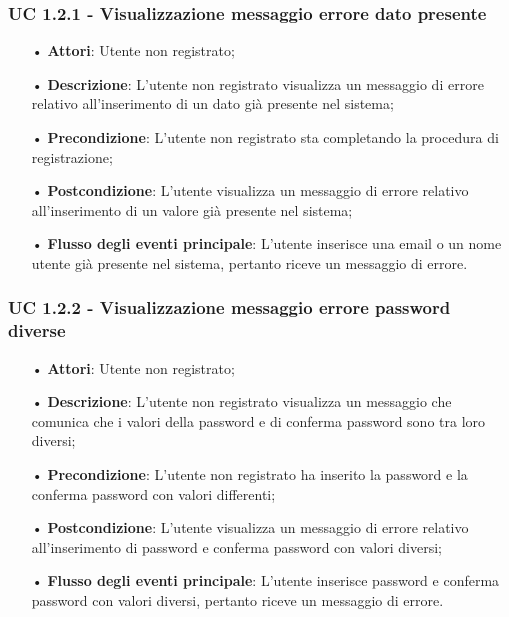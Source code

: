\subsubsection{UC 1.2.1 - Visualizzazione messaggio errore dato presente}
\begin{itemize}
	\item[•]\textbf{Attori}: Utente non registrato;
	\item[•]\textbf{Descrizione}: L'utente non registrato visualizza un messaggio di errore relativo all'inserimento
di un dato già presente nel sistema;
	\item[•]\textbf{Precondizione}: L'utente non registrato sta completando la procedura di registrazione;
	\item[•]\textbf{Postcondizione}: L'utente visualizza un messaggio di errore relativo all'inserimento di un valore già presente nel sistema;
	\item[•]\textbf{Flusso degli eventi principale}: L'utente inserisce una email o un nome utente già presente nel sistema, pertanto riceve un messaggio di errore.
\end{itemize}

\subsubsection{UC 1.2.2 - Visualizzazione messaggio errore password diverse}
\begin{itemize}
	\item[•]\textbf{Attori}: Utente non registrato;
	\item[•]\textbf{Descrizione}: L'utente non registrato visualizza un messaggio che comunica che i valori della password e di conferma password sono tra loro diversi;
	\item[•]\textbf{Precondizione}: L'utente non registrato ha inserito la password e la conferma password con valori differenti;
	\item[•]\textbf{Postcondizione}: L'utente visualizza un messaggio di errore relativo all'inserimento di password e conferma password con valori diversi;
	\item[•]\textbf{Flusso degli eventi principale}: L'utente inserisce password e conferma password con valori diversi, pertanto riceve un messaggio di errore.
\end{itemize}

